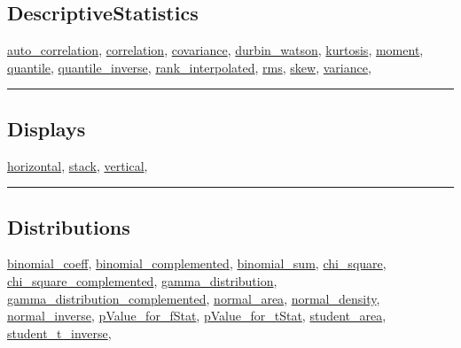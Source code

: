 \documentclass[]{book}
\theoremstyle{definition}
\theoremstyle{definition}
\theoremstyle{definition}
\theoremstyle{remark}
\begin{document}
\subsection{DescriptiveStatistics}\label{descriptivestatistics}

\href{operators-a-to-a.html\#auto_correlation}{auto\_correlation},
\href{operators-b-to-c.html\#correlation}{correlation},
\href{operators-b-to-c.html\#covariance}{covariance},
\href{operators-d-to-h.html\#durbin_watson}{durbin\_watson},
\href{operators-i-to-m.html\#kurtosis}{kurtosis},
\href{operators-i-to-m.html\#moment}{moment},
\href{operators-n-to-r.html\#quantile}{quantile},
\href{operators-n-to-r.html\#quantile_inverse}{quantile\_inverse},
\href{operators-n-to-r.html\#rank_interpolated}{rank\_interpolated},
\href{operators-n-to-r.html\#rms}{rms},
\href{operators-s-to-z.html\#skew}{skew},
\href{operators-s-to-z.html\#variance}{variance},

\begin{center}\rule{0.5\linewidth}{\linethickness}\end{center}

\subsection{Displays}\label{displays}

\href{operators-d-to-h.html\#horizontal}{horizontal},
\href{operators-s-to-z.html\#stack}{stack},
\href{operators-s-to-z.html\#vertical}{vertical},

\begin{center}\rule{0.5\linewidth}{\linethickness}\end{center}

\subsection{Distributions}\label{distributions}

\href{operators-b-to-c.html\#binomial_coeff}{binomial\_coeff},
\href{operators-b-to-c.html\#binomial_complemented}{binomial\_complemented},
\href{operators-b-to-c.html\#binomial_sum}{binomial\_sum},
\href{operators-b-to-c.html\#chi_square}{chi\_square},
\href{operators-b-to-c.html\#chi_square_complemented}{chi\_square\_complemented},
\href{operators-d-to-h.html\#gamma_distribution}{gamma\_distribution},
\href{operators-d-to-h.html\#gamma_distribution_complemented}{gamma\_distribution\_complemented},
\href{operators-n-to-r.html\#normal_area}{normal\_area},
\href{operators-n-to-r.html\#normal_density}{normal\_density},
\href{operators-n-to-r.html\#normal_inverse}{normal\_inverse},
\href{operators-n-to-r.html\#pvalue_for_fstat}{pValue\_for\_fStat},
\href{operators-n-to-r.html\#pvalue_for_tstat}{pValue\_for\_tStat},
\href{operators-s-to-z.html\#student_area}{student\_area},
\href{operators-s-to-z.html\#student_t_inverse}{student\_t\_inverse},
\end{document}
